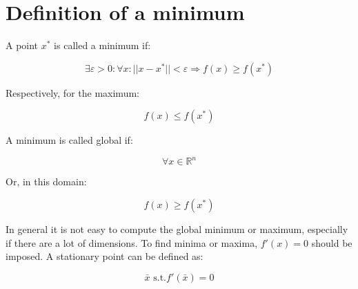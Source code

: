 \section{Definition of a minimum}
A point $x^*$ is called a minimum if:

$$\exists \varepsilon > 0 : \forall x : || x- x^* || < \varepsilon\Rightarrow f(x) \geq f(x^*)$$

Respectively, for the maximum:

$$f(x) \leq f(x^*)$$

A minimum is called global if:

$$\forall x \in \mathbb{R}^n$$

Or, in this domain:

$$f(x) \geq f(x^*)$$

In general it is not easy to compute the global minimum or maximum, especially if there are a lot of dimensions.
To find minima or maxima, $f'(x)=0$ should be imposed.
A stationary point can be defined as:

$$\bar{x} \text{ s.t.} f'(\bar{x})=0$$
